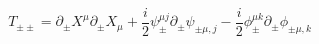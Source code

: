 \begin{equation}
T_{\pm\pm}=
\partial_{\pm}X^{\mu}\partial_{\pm}X_{\mu}+\frac{i}{ 2}\psi^{\mu j}_{\pm}\partial_{\pm}
 \psi_{\pm\mu,j }- \frac{i}{2}\phi_{\pm}^{\mu k}\partial_{\pm}\phi_{\pm\mu,k}\label{e}
\end{equation}

